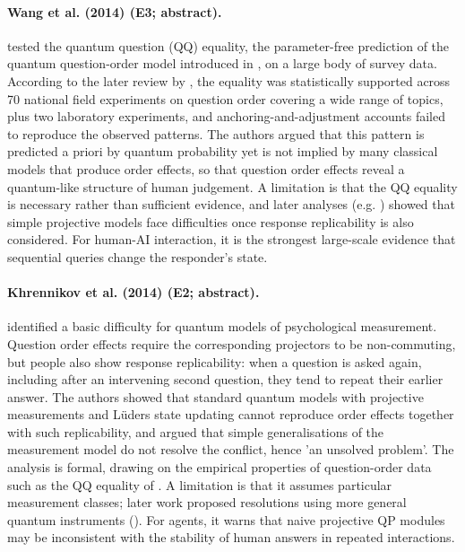 \documentclass[10pt,a4paper]{article}
\begin{document}
\paragraph{Wang et al. (2014) (E3; abstract).} \citet{Wang2014} tested the quantum question (QQ) equality, the parameter-free prediction of the quantum question-order model introduced in \citep{Wang2013b}, on a large body of survey data. According to the later review by \citep{Bruza2015}, the equality was statistically supported across 70 national field experiments on question order covering a wide range of topics, plus two laboratory experiments, and anchoring-and-adjustment accounts failed to reproduce the observed patterns. The authors argued that this pattern is predicted a priori by quantum probability yet is not implied by many classical models that produce order effects, so that question order effects reveal a quantum-like structure of human judgement. A limitation is that the QQ equality is necessary rather than sufficient evidence, and later analyses (e.g. \citet{Khrennikov2014}) showed that simple projective models face difficulties once response replicability is also considered. For human-AI interaction, it is the strongest large-scale evidence that sequential queries change the responder's state.

\paragraph{Khrennikov et al. (2014) (E2; abstract).} \citet{Khrennikov2014} identified a basic difficulty for quantum models of psychological measurement. Question order effects require the corresponding projectors to be non-commuting, but people also show response replicability: when a question is asked again, including after an intervening second question, they tend to repeat their earlier answer. The authors showed that standard quantum models with projective measurements and Lüders state updating cannot reproduce order effects together with such replicability, and argued that simple generalisations of the measurement model do not resolve the conflict, hence 'an unsolved problem'. The analysis is formal, drawing on the empirical properties of question-order data such as the QQ equality of \citep{Wang2014}. A limitation is that it assumes particular measurement classes; later work proposed resolutions using more general quantum instruments (\citep{Ozawa2021}). For agents, it warns that naive projective QP modules may be inconsistent with the stability of human answers in repeated interactions.
\end{document}
